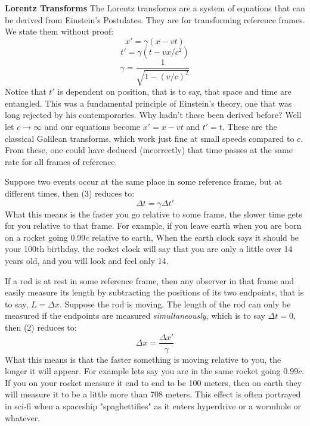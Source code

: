 \documentclass[conference]{IEEEtran}
\begin{document}
\textbf{Lorentz Transforms} The Lorentz transforms are a system of equations that can be derived from Einstein's Postulates. They are for transforming reference frames. We state them without proof:
\begin{equation}
x' = \gamma(x - vt)
\end{equation}
\begin{equation} 
t' = \gamma(t - vx/c^2)
\end{equation}
\begin{equation}
\gamma = \frac{1}{\sqrt{1 - (v/c)^2}}
\end{equation}
Notice that $t'$ is dependent on position, that is to say, that space and time are entangled. This was a fundamental principle of Einstein's theory, one that was long rejected by his contemporaries. Why hadn't these been derived before? Well let $c \rightarrow \infty$ and our equations become $x' = x - vt$ and $t' = t$. These are the classical Galilean transforms, which work just fine at small speeds compared to $c$. From these, one could have deduced (incorrectly) that time passes at the same rate for all frames of reference. \cite{lorentz}

Suppose two events occur at the same place in some reference frame, but at different times, then (3) reduces to:
\begin{equation}
\Delta t = \gamma \Delta t'
\end{equation}
What this means is the faster you go relative to some frame, the slower time gets for you relative to that frame. For example, if you leave earth when you are born on a rocket going 0.99$c$ relative to earth, When the earth clock says it should be your 100th birthday, the rocket clock will say that you are only a little over 14 years old, and you will look and feel only 14. 

If a rod is at rest in some reference frame, then any observer in that frame and easily measure its length by subtracting the positions of its two endpoints, that is to say, $L = \Delta x$. Suppose the rod is moving. The length of the rod can only be measured if the endpoints are measured \textit{simultaneously}, which is to say $\Delta t = 0$, then (2) reduces to: 
\begin{equation}
\Delta x = \frac{\Delta x'}{\gamma}
\end{equation}
What this means is that the faster something is moving relative to you, the longer it will appear. For example lets say you are in the same rocket going 0.99$c$. If you on your rocket measure it end to end to be 100 meters, then on earth they will measure it to be a little more than 708 meters. This effect is often portrayed in sci-fi when a spaceship "spaghettifies" as it enters hyperdrive or a wormhole or whatever. \cite{spaghetti}
\end{document}
